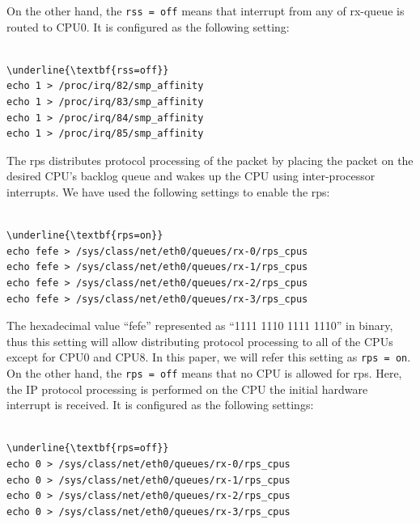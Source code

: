 On the other hand, the {\tt rss = off} means that interrupt from any of rx-queue is routed to CPU0. 
It is configured as the following setting:

\begin{center}
\begin{minipage}{0.8\columnwidth}
\begin{Verbatim}[commandchars=\\\{\}]

\underline{\textbf{rss=off}}
echo 1 > /proc/irq/82/smp_affinity
echo 1 > /proc/irq/83/smp_affinity
echo 1 > /proc/irq/84/smp_affinity
echo 1 > /proc/irq/85/smp_affinity

\end{Verbatim}
\end{minipage}
\end{center}


The rps distributes protocol processing of the packet by placing the packet
on the desired CPU's backlog queue and wakes up the CPU using inter-processor interrupts.
We have used the following settings to enable the rps:

\begin{center}
\begin{minipage}{0.8\columnwidth}
\begin{Verbatim}[commandchars=\\\{\}]

\underline{\textbf{rps=on}}
echo fefe > /sys/class/net/eth0/queues/rx-0/rps_cpus
echo fefe > /sys/class/net/eth0/queues/rx-1/rps_cpus
echo fefe > /sys/class/net/eth0/queues/rx-2/rps_cpus
echo fefe > /sys/class/net/eth0/queues/rx-3/rps_cpus

\end{Verbatim}
\end{minipage}
\end{center}

The hexadecimal value \enquote{fefe} represented as \enquote{1111 1110 1111 1110} in binary, 
thus this setting will allow distributing protocol processing to all of the CPUs except for CPU0 and CPU8.
In this paper, we will refer this setting as {\tt rps = on}.
%
On the other hand, the {\tt rps = off} means that no CPU is allowed for rps. 
Here, the IP protocol processing is performed on the CPU the initial hardware interrupt is received.
It is configured as the following settings:

\begin{center}
\begin{minipage}{0.8\columnwidth}
\begin{Verbatim}[commandchars=\\\{\}]

\underline{\textbf{rps=off}}
echo 0 > /sys/class/net/eth0/queues/rx-0/rps_cpus
echo 0 > /sys/class/net/eth0/queues/rx-1/rps_cpus
echo 0 > /sys/class/net/eth0/queues/rx-2/rps_cpus
echo 0 > /sys/class/net/eth0/queues/rx-3/rps_cpus

\end{Verbatim}
\end{minipage}
\end{center}

